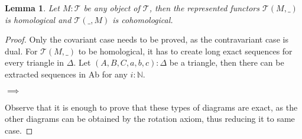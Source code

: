 \documentclass[12pt]{article}
\newtheorem{lemma}[theorem]{Lemma}
\theoremstyle{definition}
\theoremstyle{remark}
\begin{document}
            \begin{lemma}
                Let $M:\mathcal{T}$ be any object of $\mathcal{T}$, then the represented functors $\mathcal{T}(M,\_)$ is homological and $\mathcal{T}(\_,M)$ is cohomological.
            \end{lemma}

            \begin{proof}
                Only the covariant case needs to be proved, as the contravariant case is dual. For $\mathcal{T}(M,\_)$ to be homological, it has to create long exact sequences for every triangle in $\Delta$. Let $(A,B,C,a,b,c):\Delta$ be a triangle, then there can be extracted sequences in Ab for any $i:\mathbb{N}$.

                \begin{center}
                     $\implies$
                \end{center}
                Observe that it is enough to prove that these types of diagrams are exact, as the other diagrams can be obtained by the rotation axiom, thus reducing it to same case. 
                

\end{proof}
\end{document}
